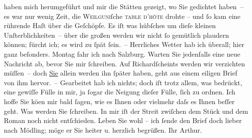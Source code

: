 \begin{ledgroupsized}[t]{13cm}
                    haben mich herumgeführt und \introOben{}mir\introOben{} die Stätten gezeigt, wo
                    Sie gedichtet haben – es war nur wenig Zeit, die \textsc{Weil{\pb}guni}ſche \textsc{table d’hôte} drohte – und ſo kam eine
                    rührende Haſt über die Geſchöpfe. Es iſt was hübſches um dieſe kleinen
                    Unſterblichkeiten – über die großen werden wir nicht ſo gemütlich plaudern
                    können; fürcht ich; es wird zu ſpät ſein. –\pend
           \pstart
           Herrliches Wetter hab ich überall; hier ganz beſonders. Montag fahr
                    ich nach Salzburg. Warten Sie {\pb}jedenfalls eine neue Nachricht ab, bevor Sie mir
                    ſchreiben. Auf Richardſcheints werden wir verzichten müſſen – doch
                        \uline{Sie}{ }\introOben{}allein\introOben{} werden ihn ſpäter haben, geht aus einem eiligen
                    Brief von ihm hervor. –\pend
           \pstart
           Gearbeitet hab ich nichts; doch iſt trotz allem, was bedrückt, eine gewiſſe Fülle
                    in mir, ja ſogar die Neigung dieſer Fülle, ſich zu {\pb}ordnen.\pend
           \pstart
           Ich hoffe Sie kö{\geminationn}en mir bald ſagen, wie es Ihnen
                        \introOben{}oder vielmehr\introOben{} daſs es Ihnen beſſer geht. Was werden
                    Sie ſchreiben. In mir iſt der Streit zwiſchen dem Stück und dem Roman noch nicht entſchieden.\pend
           \pstart
           Leben Sie wohl – ich ſende den Brief doch lieber nach Mödling; möge er Sie heiter u. herzlich begrüßen.\pend
           \pstart Ihr \spacefill\mbox{Arthur.}\pend{}\endnumbering{}\end{ledgroupsized}  \newcommand{\dateiname}{L00826}\newcommand{\titel}{Arthur Schnitzler an Hugo von Hofmannsthal, 23. 7. 1898}\newcommand{\editorInnen}{Martin Anton Müller und Gerd-Hermann Susen}
      
